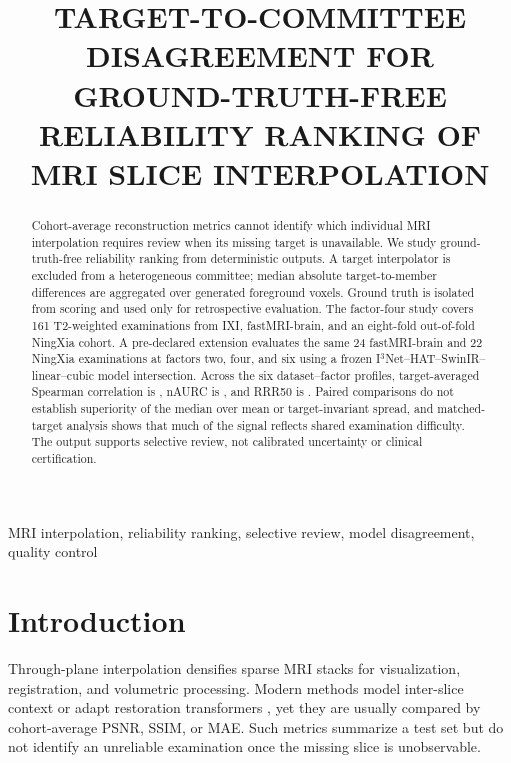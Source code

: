 \documentclass{article}
\title{TARGET-TO-COMMITTEE DISAGREEMENT FOR GROUND-TRUTH-FREE\\
RELIABILITY RANKING OF MRI SLICE INTERPOLATION}
\begin{document}
\ninept
\maketitle

\begin{abstract}
Cohort-average reconstruction metrics cannot identify which individual MRI interpolation requires review when its missing target is unavailable. We study ground-truth-free reliability ranking from deterministic outputs. A target interpolator is excluded from a heterogeneous committee; median absolute target-to-member differences are aggregated over generated foreground voxels. Ground truth is isolated from scoring and used only for retrospective evaluation. The factor-four study covers 161 T2-weighted examinations from IXI, fastMRI-brain, and an eight-fold out-of-fold NingXia cohort. A pre-declared extension evaluates the same 24 fastMRI-brain and 22 NingXia examinations at factors two, four, and six using a frozen I$^3$Net--HAT--SwinIR--linear--cubic model intersection. Across the six dataset--factor profiles, target-averaged Spearman correlation is \CrossScaleRhoRange, nAURC is \CrossScaleNAURCRange, and RRR50 is \CrossScaleRRRRange. Paired comparisons do not establish superiority of the median over mean or target-invariant spread, and matched-target analysis shows that much of the signal reflects shared examination difficulty. The output supports selective review, not calibrated uncertainty or clinical certification.
\end{abstract}

\begin{keywords}
MRI interpolation, reliability ranking, selective review, model disagreement, quality control
\end{keywords}

\section{Introduction}
Through-plane interpolation densifies sparse MRI stacks for visualization, registration, and volumetric processing. Modern methods model inter-slice context or adapt restoration transformers \cite{song2024i3net,liang2021swinir,chen2022hat}, yet they are usually compared by cohort-average PSNR, SSIM, or MAE. Such metrics summarize a test set but do not identify an unreliable examination once the missing slice is unobservable.
\end{document}
